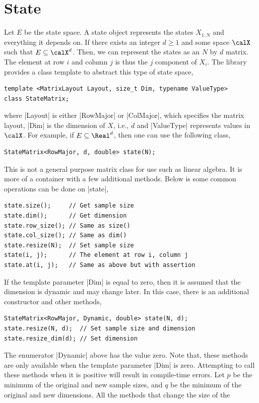 \section{State}
\label{sec:State}

Let $E$ be the state space. A state object represents the states $X_{1:N}$ and
everything it depends on. If there exists an integer $d\ge1$ and some space
$\calX$ such that $E\subseteq\calX^d$. Then, we can represent the states as an
$N$ by $d$ matrix. The element at row $i$ and column $j$ is thus the $j$\ith
component of $X_i$. The library provides a class template to abstract this type
of state space,
\begin{Verbatim}
template <MatrixLayout Layout, size_t Dim, typename ValueType>
class StateMatrix;
\end{Verbatim}
where |Layout| is either |RowMajor| or |ColMajor|, which specifies the matrix
layout, |Dim| is the dimension of $X$, i.e., $d$ and |ValueType| represents
values in $\calX$. For example, if $E\subseteq\Real^d$, then one can use the
following class,
\begin{Verbatim}
StateMatrix<RowMajor, d, double> state(N);
\end{Verbatim}
This is not a general purpose matrix class for use such as linear algebra. It
is more of a container with a few additional methods. Below is some common
operations can be done on |state|,
\begin{Verbatim}
state.size();     // Get sample size
state.dim();      // Get dimension
state.row_size(); // Same as size()
state.col_size(); // Same as dim()
state.resize(N);  // Set sample size
state(i, j);      // The element at row i, column j
state.at(i, j);   // Same as above but with assertion
\end{Verbatim}
If the template parameter |Dim| is equal to zero, then it is assumed that the
dimension is dynamic and may change later. In this case, there is an additional
constructor and other methods,
\begin{Verbatim}
StateMatrix<RowMajor, Dynamic, double> state(N, d);
state.resize(N, d);  // Set sample size and dimension
state.resize_dim(d); // Set dimension
\end{Verbatim}
The enumerator |Dynamic| above has the value zero. Note that, these methods are
only available when the template parameter |Dim| is zero. Attempting to call
these methods when it is positive will result in compile-time errors. Let $p$
be the minimum of the original and new sample sizes, and $q$ be the minimum of
the original and new dimensions. All the methods that change the size of the
